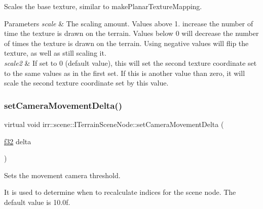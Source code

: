 Scales the base texture, similar to make\+Planar\+Texture\+Mapping. 


\begin{DoxyParams}{Parameters}
{\em scale} & The scaling amount. Values above 1. increase the number of time the texture is drawn on the terrain. Values below 0 will decrease the number of times the texture is drawn on the terrain. Using negative values will flip the texture, as well as still scaling it. \\
\hline
{\em scale2} & If set to 0 (default value), this will set the second texture coordinate set to the same values as in the first set. If this is another value than zero, it will scale the second texture coordinate set by this value. \\
\hline
\end{DoxyParams}
\mbox{\label{classirr_1_1scene_1_1ITerrainSceneNode_af2c07f67c1c5319de4a796ec57950ec3}} 
\subsubsection{\texorpdfstring{set\+Camera\+Movement\+Delta()}{setCameraMovementDelta()}}
{\footnotesize\ttfamily virtual void irr\+::scene\+::\+I\+Terrain\+Scene\+Node\+::set\+Camera\+Movement\+Delta (\begin{DoxyParamCaption}\item[{\hyperlink{namespaceirr_a0277be98d67dc26ff93b1a6a1d086b07}{f32}}]{delta }\end{DoxyParamCaption})\hspace{0.3cm}{\ttfamily [pure virtual]}}



Sets the movement camera threshold. 

It is used to determine when to recalculate indices for the scene node. The default value is 10.\+0f. \mbox{\label{classirr_1_1scene_1_1ITerrainSceneNode_ad11f3e54c291487c49868728a5228b5e}} 
